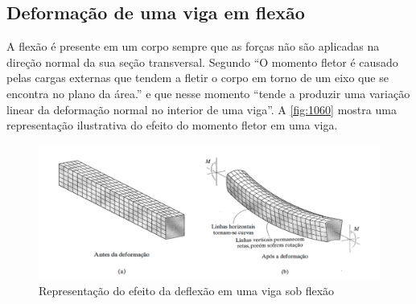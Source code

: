 %
%
%
%
%
%
%
%
%
%
%
%

\subsection{Deformação de uma viga em flexão}

A flexão é presente em um corpo sempre que as forças não são aplicadas na direção normal da sua seção transversal.
Segundo \autocite{Hibbeler2010} “O momento fletor é causado pelas cargas externas que tendem a fletir o corpo em torno de um eixo que se encontra no plano da área.”
e que nesse momento “tende a produzir uma variação linear da deformação normal no interior de uma viga”.
A \autoref{fig:1060} mostra uma representação ilustrativa do efeito do momento fletor em uma viga.

\begin{figure}[htb]
	\caption{\label{fig:1060} Representação do efeito da deflexão em uma viga sob flexão}
	\begin{center}
		\includegraphics[width=\textwidth]{pictures/1060.png}
	\end{center}
\end{figure}

